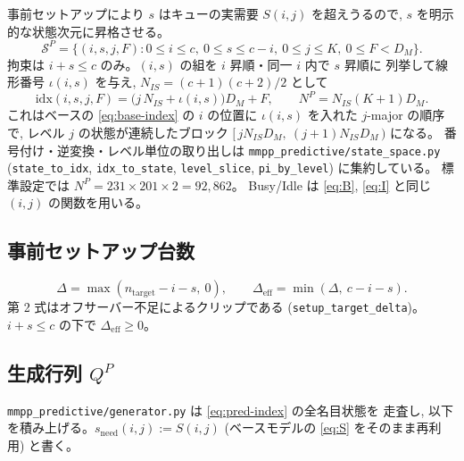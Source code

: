 \documentclass[a4paper,11pt]{article}
\newcommand{\code}[1]{\texttt{#1}}
\newcommand{\eff}{\mathrm{eff}}
\begin{document}
事前セットアップにより $s$ はキューの実需要 $S(i,j)$ を超えうるので,
$s$ を明示的な状態次元に昇格させる。
\begin{equation}
  \mathcal{S}^{P}=\{(i,s,j,F): 0\le i\le c,\ 0\le s\le c-i,\ 0\le j\le K,\ 0\le F<D_M\}.
\end{equation}
拘束は $i+s\le c$ のみ。$(i,s)$ の組を $i$ 昇順・同一 $i$ 内で $s$ 昇順に
列挙して線形番号 $\iota(i,s)$ を与え, $N_{IS}=(c+1)(c+2)/2$ として
\begin{equation}
  \mathrm{idx}(i,s,j,F)=\bigl(j\,N_{IS}+\iota(i,s)\bigr)D_M+F,\qquad
  N^{P}=N_{IS}(K+1)D_M .
  \label{eq:pred-index}
\end{equation}
これはベースの \eqref{eq:base-index} の $i$ の位置に $\iota(i,s)$ を入れた
$j$-major の順序で, レベル $j$ の状態が連続したブロック
$[\,jN_{IS}D_M,\ (j+1)N_{IS}D_M\,)$ になる。
番号付け・逆変換・レベル単位の取り出しは \code{mmpp\_predictive/state\_space.py}
(\code{state\_to\_idx}, \code{idx\_to\_state}, \code{level\_slice}, \code{pi\_by\_level})
に集約している。
標準設定では $N^P = 231\times201\times2 = 92{,}862$。
Busy/Idle は \eqref{eq:B}, \eqref{eq:I} と同じ $(i,j)$ の関数を用いる。

\subsection{事前セットアップ台数}

\begin{equation}
  \Delta = \max(n_{\mathrm{target}}-i-s,\ 0),\qquad
  \Delta_{\eff} = \min(\Delta,\ c-i-s).
  \label{eq:delta}
\end{equation}
第 2 式はオフサーバー不足によるクリップである
(\code{setup\_target\_delta})。$i+s\le c$ の下で $\Delta_{\eff}\ge0$。

\subsection{生成行列 $Q^{P}$}

\code{mmpp\_predictive/generator.py} は \eqref{eq:pred-index} の全名目状態を
走査し, 以下を積み上げる。$s_{\mathrm{need}}(i,j):=S(i,j)$
(ベースモデルの \eqref{eq:S} をそのまま再利用) と書く。
\end{document}
